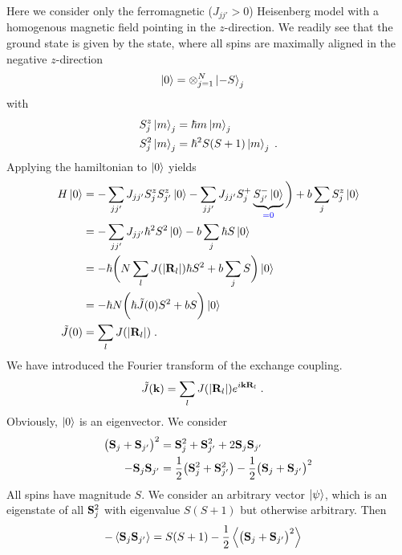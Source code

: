 Here we consider only the   ferromagnetic ($J_{jj'}>0$) Heisenberg model
with a homogenous magnetic field pointing in the $z$-direction.
We readily see that the ground state is given by the 
state, where all spins are maximally aligned in the negative $z$-direction
%
\begin{align}\label{eq:}
\ket{0} &= \otimes_{j=1}^{N} \ket{-S}_{j}
\end{align}
%
with
\begin{subequations}\label{eq:}
\begin{align}
S_{j}^{z} \ket{m}_{j} &=\hbar m \ket{m}_{j}\\
S_{j}^{2} \ket{m}_{j} &=\hbar^{2} S(S+1) \ket{m}_{j}\;.
\end{align}
\end{subequations}
Applying the hamiltonian to $\ket{0}$ yields
%
\begin{align*}
H\ket{0} &= - \sum_{jj'} J_{jj'} S_{j}^{z}  S_{j'}^{z}\ket{0}
- \sum_{jj'} J_{jj'} S_{j}^{+} \underbrace{
S_{j'}^{-}\ket{0}
}_{\color{blue} = 0}
\bigg) + b \sum_{j} S^{z}_{j}\ket{0}\\
&= - \sum_{jj'} J_{jj'} \hbar^{2} S^{2}  \ket{0} - b \sum_{j} \hbar S \ket{0}\\
&=-\hbar  \bigg(N \sum_{l} J(|\mathbf R_{l}|) \hbar  S^{2}  + b \sum_{j}  S \bigg)\ket{0}\\
&=-\hbar  N \bigg(\hbar \tilde J(0)  S^{2}  + b   S \bigg)\ket{0}\\
\tilde J(0) &=  \sum_{l} J(|\mathbf R_{l}|) \;.
\end{align*}
%
We have introduced the Fourier transform of the exchange coupling.
%
\begin{align}\label{eq:heisenberg:J:q}
\tilde J(\mathbf k) &= \sum_{l} J(|\mathbf R_{l}|) e^{i \mathbf k \mathbf R_{l}}\;.
\end{align}
%
Obviously, $\ket{0}$ is an eigenvector.
We consider
%
\begin{align*}
\big( \mathbf S_{j} + \mathbf S_{j'} \big)^{2} &= \mathbf S_{j}^{2}+\mathbf S_{j'}^{2} + 2 \mathbf S_{j} \mathbf S_{j'}\\
- \mathbf S_{j} \mathbf S_{j'} &= \frac{1}{2}\big(\mathbf S_{j}^{2}+\mathbf S_{j'}^{2} \big)- 
\frac{1}{2}\big( \mathbf S_{j} + \mathbf S_{j'} \big)^{2}
\end{align*}
%
All spins have magnitude $S$. We consider an arbitrary vector $\ket{\psi}$, which is an eigenstate 
of all $\mathbf S_{j}^{2}$  with eigenvalue $S(S+1)$ but otherwise arbitrary. Then
\begin{align*}
- \left\langle\mathbf S_{j} \mathbf S_{j'}\right\rangle  &= S(S+1) 
- \frac{1}{2}\left\langle\big( \mathbf S_{j} + \mathbf S_{j'} \big)^{2}\right\rangle
\end{align*}
